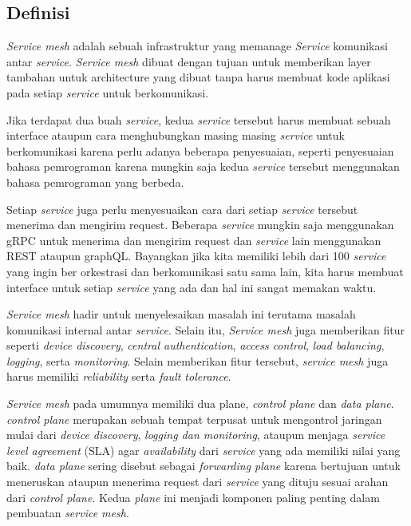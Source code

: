 \subsection{Definisi}

\textit{Service mesh} adalah sebuah infrastruktur yang memanage \textit{Service} komunikasi antar \textit{service}. \textit{Service mesh} dibuat dengan tujuan untuk memberikan layer tambahan untuk architecture yang dibuat tanpa harus membuat kode aplikasi pada setiap \textit{service} untuk berkomunikasi.\parencite{li2019}

Jika terdapat dua buah \textit{service}, kedua \textit{service} tersebut harus membuat sebuah interface ataupun cara menghubungkan masing masing \textit{service} untuk berkomunikasi karena perlu adanya beberapa penyesuaian, seperti penyesuaian bahasa pemrograman karena mungkin saja kedua \textit{service} tersebut menggunakan bahasa pemrograman yang berbeda.

Setiap \textit{service} juga perlu menyesuaikan cara dari setiap \textit{service} tersebut menerima dan mengirim request. Beberapa \textit{service} mungkin saja menggunakan gRPC untuk menerima dan mengirim request dan \textit{service} lain menggunakan REST ataupun graphQL. Bayangkan jika kita memiliki lebih dari 100 \textit{service} yang ingin ber orkestrasi dan berkomunikasi satu sama lain, kita harus membuat interface untuk setiap \textit{service} yang ada dan hal ini sangat memakan waktu.

\textit{Service mesh} hadir untuk menyelesaikan masalah ini terutama masalah komunikasi internal antar \textit{service}. Selain itu, \textit{Service mesh} juga memberikan fitur seperti \textit{device discovery}, \textit{central authentication}, \textit{access control}, \textit{load balancing}, \textit{logging}, serta \textit{monitoring}. Selain memberikan fitur tersebut, \textit{\textit{service} mesh} juga harus memiliki \textit{reliability} serta \textit{fault tolerance}. \parencite{li2019}

\textit{Service mesh} pada umumnya memiliki dua plane, \textit{control plane} dan \textit{data plane}. \textit{control plane} merupakan sebuah tempat terpusat untuk mengontrol jaringan mulai dari \textit{device discovery}, \textit{logging dan monitoring}, ataupun menjaga \textit{service level agreement} (SLA) agar \textit{availability} dari \textit{service} yang ada memiliki nilai yang baik. \textit{data plane} sering disebut sebagai \textit{forwarding plane} karena bertujuan untuk meneruskan ataupun menerima request dari \textit{service} yang dituju sesuai arahan dari \textit{control plane}. Kedua \textit{plane} ini menjadi komponen paling penting dalam pembuatan \textit{\textit{service} mesh}.

